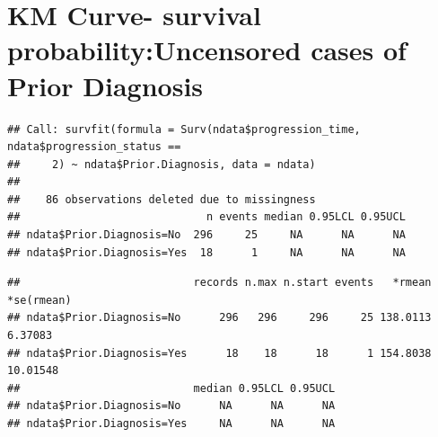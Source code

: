 \documentclass[
  11pt,
]{article}
\newenvironment{Shaded}{\begin{snugshade}}{\end{snugshade}}
\newcommand{\AttributeTok}[1]{\textcolor[rgb]{0.77,0.63,0.00}{#1}}
\newcommand{\DecValTok}[1]{\textcolor[rgb]{0.00,0.00,0.81}{#1}}
\newcommand{\FunctionTok}[1]{\textcolor[rgb]{0.00,0.00,0.00}{#1}}
\newcommand{\NormalTok}[1]{#1}
\newcommand{\OtherTok}[1]{\textcolor[rgb]{0.56,0.35,0.01}{#1}}
\newcommand{\SpecialCharTok}[1]{\textcolor[rgb]{0.00,0.00,0.00}{#1}}
\newcommand{\StringTok}[1]{\textcolor[rgb]{0.31,0.60,0.02}{#1}}
\begin{document}
\newpage
\section{KM Curve- survival probability:Uncensored cases of Prior Diagnosis}

\begin{Shaded}
\end{Shaded}

\begin{verbatim}
## Call: survfit(formula = Surv(ndata$progression_time, ndata$progression_status == 
##     2) ~ ndata$Prior.Diagnosis, data = ndata)
## 
##    86 observations deleted due to missingness 
##                             n events median 0.95LCL 0.95UCL
## ndata$Prior.Diagnosis=No  296     25     NA      NA      NA
## ndata$Prior.Diagnosis=Yes  18      1     NA      NA      NA
\end{verbatim}

\begin{Shaded}
\end{Shaded}

\begin{verbatim}
##                           records n.max n.start events   *rmean *se(rmean)
## ndata$Prior.Diagnosis=No      296   296     296     25 138.0113    6.37083
## ndata$Prior.Diagnosis=Yes      18    18      18      1 154.8038   10.01548
##                           median 0.95LCL 0.95UCL
## ndata$Prior.Diagnosis=No      NA      NA      NA
## ndata$Prior.Diagnosis=Yes     NA      NA      NA
\end{verbatim}
\end{document}
